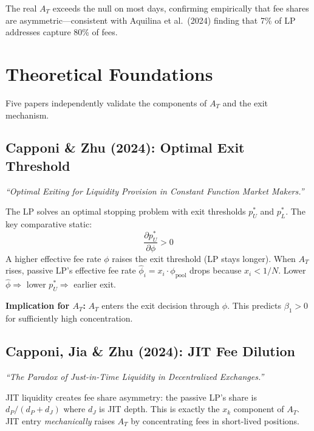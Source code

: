 \documentclass[11pt,a4paper]{article}
\begin{document}
The real $A_T$ exceeds the null on most days, confirming empirically that
fee shares are asymmetric---consistent with Aquilina et al.\ (2024) finding
that 7\% of LP addresses capture 80\% of fees.


\section{Theoretical Foundations}\label{sec:theory}

Five papers independently validate the components of $A_T$ and the exit
mechanism.

\subsection{Capponi \& Zhu (2024): Optimal Exit Threshold}

\emph{``Optimal Exiting for Liquidity Provision in Constant Function Market
Makers.''}

The LP solves an optimal stopping problem with exit thresholds $p_U^*$ and
$p_L^*$. The key comparative static:
\begin{equation}\label{eq:capponi-zhu}
  \frac{\partial p_U^*}{\partial \phi} > 0
\end{equation}
A higher effective fee rate $\phi$ raises the exit threshold (LP stays
longer). When $A_T$ rises, passive LP's effective fee rate $\hat\phi_i =
x_i \cdot \phi_{\text{pool}}$ drops because $x_i < 1/N$. Lower $\hat\phi
\Rightarrow$ lower $p_U^* \Rightarrow$ earlier exit.

\textbf{Implication for $A_T$:} $A_T$ enters the exit decision through
$\hat\phi$. This predicts $\beta_1 > 0$ for sufficiently high concentration.

\subsection{Capponi, Jia \& Zhu (2024): JIT Fee Dilution}

\emph{``The Paradox of Just-in-Time Liquidity in Decentralized Exchanges.''}

JIT liquidity creates fee share asymmetry: the passive LP's share is
$d_P / (d_P + d_J)$ where $d_J$ is JIT depth. This is exactly the $x_k$
component of $A_T$. JIT entry \emph{mechanically} raises $A_T$ by
concentrating fees in short-lived positions.
\end{document}
